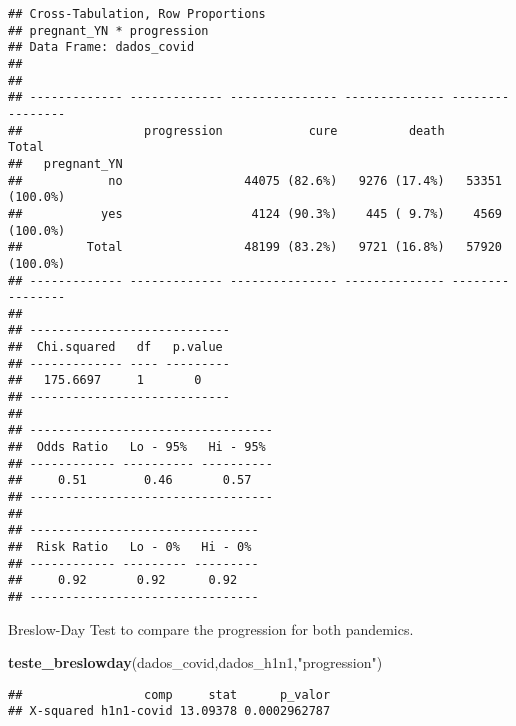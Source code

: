 \documentclass[
]{article}
\newenvironment{Shaded}{\begin{snugshade}}{\end{snugshade}}
\newcommand{\KeywordTok}[1]{\textcolor[rgb]{0.13,0.29,0.53}{\textbf{#1}}}
\newcommand{\NormalTok}[1]{#1}
\newcommand{\StringTok}[1]{\textcolor[rgb]{0.31,0.60,0.02}{#1}}
\begin{document}
\begin{verbatim}
## Cross-Tabulation, Row Proportions  
## pregnant_YN * progression  
## Data Frame: dados_covid  
## 
## 
## ------------- ------------- --------------- -------------- ----------------
##                 progression            cure          death            Total
##   pregnant_YN                                                              
##            no                 44075 (82.6%)   9276 (17.4%)   53351 (100.0%)
##           yes                  4124 (90.3%)    445 ( 9.7%)    4569 (100.0%)
##         Total                 48199 (83.2%)   9721 (16.8%)   57920 (100.0%)
## ------------- ------------- --------------- -------------- ----------------
## 
## ----------------------------
##  Chi.squared   df   p.value 
## ------------- ---- ---------
##   175.6697     1       0    
## ----------------------------
## 
## ----------------------------------
##  Odds Ratio   Lo - 95%   Hi - 95% 
## ------------ ---------- ----------
##     0.51        0.46       0.57   
## ----------------------------------
## 
## --------------------------------
##  Risk Ratio   Lo - 0%   Hi - 0% 
## ------------ --------- ---------
##     0.92       0.92      0.92   
## --------------------------------
\end{verbatim}

Breslow-Day Test to compare the progression for both pandemics.

\begin{Shaded}
\begin{Highlighting}[]
\KeywordTok{teste_breslowday}\NormalTok{(dados_covid,dados_h1n1,}\StringTok{"progression"}\NormalTok{)}
\end{Highlighting}
\end{Shaded}

\begin{verbatim}
##                 comp     stat      p_valor
## X-squared h1n1-covid 13.09378 0.0002962787
\end{verbatim}
\end{document}
